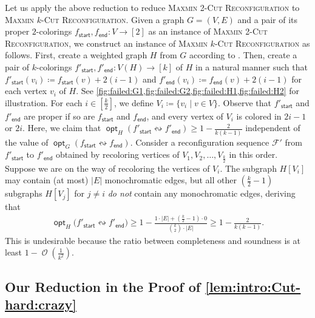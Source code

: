 \documentclass[11pt,fleqn]{article}
\renewcommand{\geq}{\geqslant}
\newcommand{\prb}[1]{\textsc{#1}\xspace}
\newcommand{\reco}{\leftrightsquigarrow}
\newcommand{\defeq}{\coloneq}
\DeclareMathOperator{\bigO}{\mathcal{O}}
\DeclareMathOperator{\opt}{\mathsf{opt}}
\newcommand{\sss}{\mathsf{start}}
\newcommand{\ttt}{\mathsf{end}}
\newcommand{\f}{f}
\newcommand{\sqcol}{\scrF}
\newcommand{\MMkCutReconf}{\prb{Maxmin $k$-Cut Reconfiguration}}
\newcommand{\MMtwoCutReconf}{\prb{Maxmin 2-Cut Reconfiguration}}
\newcommand{\scrF}{\mathscr{F}}
\theoremstyle{definition}
\numberwithin{equation}{section}
\begin{document}
Let us apply the above reduction to reduce
\MMtwoCutReconf to \MMkCutReconf.
Given a graph $G=(V,E)$ and a pair of its proper $2$-colorings $\f_\sss,\f_\ttt \colon V \to [2]$
as an instance of \MMtwoCutReconf,
we construct an instance of \MMkCutReconf as follows.
First, create a weighted graph $H$ from $G$ according to \cite{kann1997hardness}.
Then, create a pair of $k$-colorings $\f'_\sss,\f'_\ttt \colon V(H) \to [k]$ of $H$
in a natural manner such that
$\f'_\sss(v_i) \defeq \f_\sss(v) + 2(i-1)$ and
$\f'_\ttt(v_i) \defeq \f_\ttt(v) + 2(i-1)$ for each vertex $v_i$ of $H$.
See \cref{fig:failed:G1,fig:failed:G2,fig:failed:H1,fig:failed:H2} for illustration.
For each $i \in \left[\frac{k}{2}\right]$, we define $V_i \defeq \{v_i \mid v \in V \}$.
Observe that
$\f'_\sss$ and $\f'_\ttt$ are proper if so are $\f_\sss$ and $\f_\ttt$, and
every vertex of $V_i$ is colored in $2i-1$ or $2i$.
Here, we claim that
$\opt_H(\f'_\sss \reco \f'_\ttt) \geq 1 - \frac{2}{k(k-1)}$
independent of the value of $\opt_G(\f_\sss \reco \f_\ttt)$.
Consider a reconfiguration sequence $\sqcol'$ from $\f'_\sss$ to $\f'_\ttt$
obtained by recoloring vertices of $V_1, V_2, \ldots, V_{\frac{k}{2}}$ in this order.
Suppose we are on the way of recoloring the vertices of $V_i$.
The subgraph $H[V_i]$ may contain (at most) $|E|$ monochromatic edges, but
all other $(\frac{k}{2}-1)$ subgraphs $H[V_j]$ for $j \neq i$ \emph{do not} contain any monochromatic edges,
deriving that
\begin{align}
    \opt_H\bigl(\f'_\sss \reco \f'_\ttt\bigr)
    \geq 1 - \frac{1 \cdot |E| + \left(\frac{k}{2}-1\right) \cdot 0}{{k \choose 2} \cdot |E|}
    \geq 1 - \frac{2}{k(k-1)}.
\end{align}
This is undesirable because
the ratio between completeness and soundness is at least 
$1 - \bigO\left(\frac{1}{k^2}\right)$.











\subsection{Our Reduction in the Proof of \texorpdfstring{\cref{lem:intro:Cut-hard:crazy}}{Lemma~\protect\ref{lem:intro:Cut-hard:crazy}}}
\label{sec:overview-Cut-hard:our}
\end{document}
